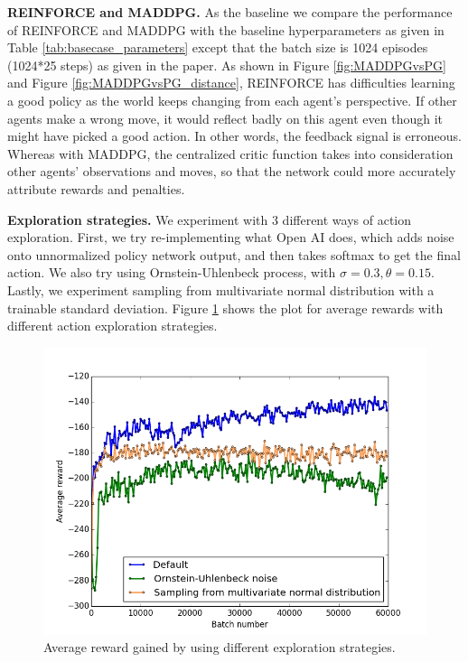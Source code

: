 \documentclass{article}
\begin{document}
\textbf{REINFORCE and MADDPG.} As the baseline we compare the performance of REINFORCE and MADDPG with the baseline hyperparameters as given in Table \ref{tab:basecase_parameters} except that the batch size is 1024 episodes (1024*25 steps) as given in the \cite{maddpg} paper. As shown in Figure \ref{fig:MADDPGvsPG} and Figure \ref{fig:MADDPGvsPG_distance}, REINFORCE has difficulties learning a good policy as the world keeps changing from each agent's perspective. If other agents make a wrong move, it would reflect badly on this agent even though it might have picked a good action. In other words, the feedback signal is erroneous. Whereas with MADDPG, the centralized critic function takes into consideration other agents' observations and moves, so that the network could more accurately attribute rewards and penalties.  

\textbf{Exploration strategies.} We experiment with 3 different ways of action exploration. First, we try re-implementing what Open AI does, which adds noise onto unnormalized policy network output, and then takes softmax to get the final action. We also try using Ornstein-Uhlenbeck process, with $\sigma = 0.3, \theta = 0.15$. Lastly, we experiment sampling from multivariate normal distribution with a trainable standard deviation. Figure \ref{fig:defaultVSouVSdist} shows the plot for average rewards with different action exploration strategies.

\begin{figure}
\begin{center}
\includegraphics[scale=0.4]{defaultVSouVSdist}
\end{center}
\caption{Average reward gained by using different exploration strategies.}
\label{fig:defaultVSouVSdist}
\end{figure}
\end{document}
